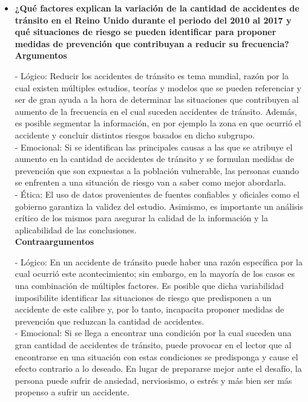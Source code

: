 \documentclass[12pt]{article}
\begin{document}
\begin{itemize}
    \item[4.] \textbf{¿Qué factores explican la variación de la cantidad de accidentes de tránsito en el Reino Unido durante el periodo del 2010 al 2017 y qué situaciones de riesgo se pueden identificar para proponer medidas de prevención que contribuyan a reducir su frecuencia?}\\
 
    \textbf{Argumentos}
    
    - Lógico: Reducir los accidentes de tránsito es tema mundial, razón por la cual existen múltiples estudios, teorías y modelos que se pueden referenciar y ser de gran ayuda a la hora de determinar las situaciones que contribuyen al aumento de la frecuencia en el cual suceden accidentes de tránsito. Además, es posible segmentar la información, en por ejemplo la zona en que ocurrió el accidente y concluir distintos riesgos basados en dicho subgrupo. \\  
    
    - Emocional: Si se identifican las principales causas a las que se atribuye el aumento en la cantidad de accidentes de tránsito y se formulan medidas de prevención que son expuestas a la población vulnerable, las personas cuando se enfrenten a una situación de riesgo van a saber como mejor abordarla. \\ 
    
    - Ética: El uso de datos provenientes de fuentes confiables y oficiales como el gobierno garantiza la validez del estudio. Asimismo, es importante un análisis crítico de los mismos para asegurar la calidad de la información y la aplicabilidad de las conclusiones. \\  
     
     
    \textbf{Contraargumentos} 
    
    - Lógico: En un accidente de tránsito puede haber una razón específica por la cual ocurrió este acontecimiento; sin embargo, en la mayoría de los casos es una combinación de múltiples factores. Es posible que dicha variabilidad imposibilite identificar las situaciones de riesgo que predisponen a un accidente de este calibre y, por lo tanto, incapacita proponer medidas de prevención que reduzcan la cantidad de accidentes. \\
    
    - Emocional: Si se llega a encontrar una condición por la cual suceden una gran cantidad de accidentes de tránsito, puede provocar en el lector que al encontrarse en una situación con estas condiciones se predisponga y cause el efecto contrario a lo deseado. En lugar de prepararse mejor ante el desafío, la persona puede sufrir de ansiedad, nerviosismo, o estrés y más bien ser más propenso a sufrir un accidente. \\


\end{itemize}
\end{document}
